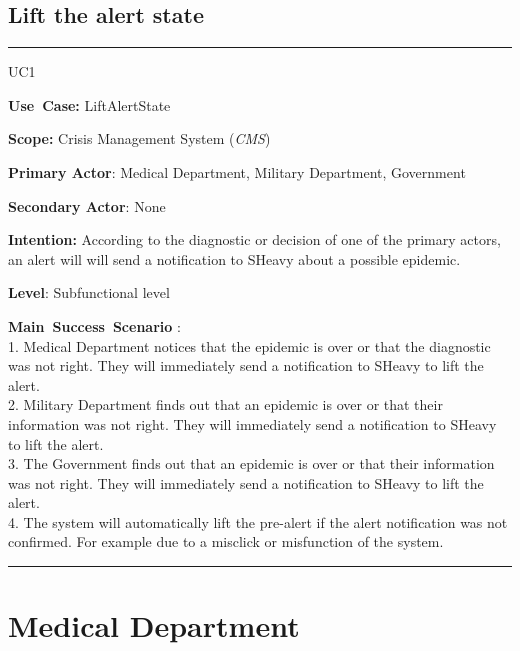 \subsection{Lift the alert state}
\vspace{0.5cm}
\hrule
\vspace{0.5cm}
\begin{lyxlist}{UC1}
\small{
\item [\textbf{Use~Case:}] LiftAlertState
\item [\textbf{Scope:}] Crisis Management System (\emph{CMS})
\item [\textbf{Primary Actor}:] Medical Department, Military Department,
Government
\item [\textbf{Secondary Actor}:] None
\item [\textbf{Intention:}] According to the diagnostic or decision of one of
the primary actors, an alert will will send a notification to SHeavy about a
possible epidemic.
\item [\textbf{Level}:]Subfunctional level
\item [\textbf{Main~Success~Scenario}]:\\
1. Medical Department notices that the epidemic is over or that the
diagnostic was not right. They will immediately send a notification to SHeavy
to lift the alert.\\
2. Military Department finds out that an epidemic is over or that their
information was not right. They will immediately send a notification to SHeavy
to lift the alert.\\
3. The Government finds out that an epidemic is over or that their
information was not right. They will immediately send a notification to SHeavy
to lift the alert.\\
4. The system will automatically lift the pre-alert if the alert notification
was not confirmed. For example due to a misclick or misfunction of the system.\\
}
\end{lyxlist}
\hrule
\vspace{0.5cm} 

\section{Medical Department}

